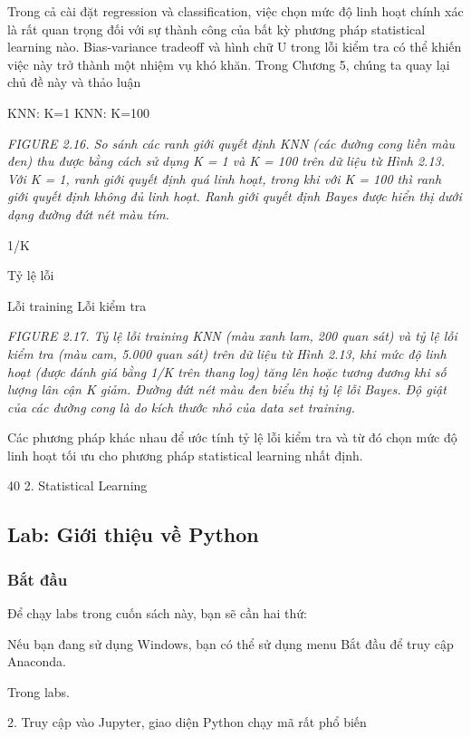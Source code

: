 Trong cả cài đặt regression và classification, việc chọn mức độ linh hoạt chính xác là rất quan trọng đối với sự thành công của bất kỳ phương pháp statistical learning nào. Bias-variance tradeoff và hình chữ U trong lỗi kiểm tra có thể khiến việc này trở thành một nhiệm vụ khó khăn. Trong Chương 5, chúng ta quay lại chủ đề này và thảo luận

KNN: K=1 KNN: K=100

\noindent\textit{FIGURE 2.16. So sánh các ranh giới quyết định KNN (các đường cong liền màu đen) thu được bằng cách sử dụng K = 1 và K = 100 trên dữ liệu từ Hình 2.13. Với K = 1, ranh giới quyết định quá linh hoạt, trong khi với K = 100 thì ranh giới quyết định không đủ linh hoạt. Ranh giới quyết định Bayes được hiển thị dưới dạng đường đứt nét màu tím.}

1/K

Tỷ lệ lỗi

Lỗi training Lỗi kiểm tra

\noindent\textit{FIGURE 2.17. Tỷ lệ lỗi training KNN (màu xanh lam, 200 quan sát) và tỷ lệ lỗi kiểm tra (màu cam, 5.000 quan sát) trên dữ liệu từ Hình 2.13, khi mức độ linh hoạt (được đánh giá bằng 1/K trên thang log) tăng lên hoặc tương đương khi số lượng lân cận K giảm. Đường đứt nét màu đen biểu thị tỷ lệ lỗi Bayes. Độ giật của các đường cong là do kích thước nhỏ của data set training.}

Các phương pháp khác nhau để ước tính tỷ lệ lỗi kiểm tra và từ đó chọn mức độ linh hoạt tối ưu cho phương pháp statistical learning nhất định.

40 2. Statistical Learning

\subsection{Lab: Giới thiệu về Python}

\subsubsection{Bắt đầu}

Để chạy labs trong cuốn sách này, bạn sẽ cần hai thứ:

Nếu bạn đang sử dụng Windows, bạn có thể sử dụng menu Bắt đầu để truy cập Anaconda.

Trong labs.

2. Truy cập vào Jupyter, giao diện Python chạy mã rất phổ biến

